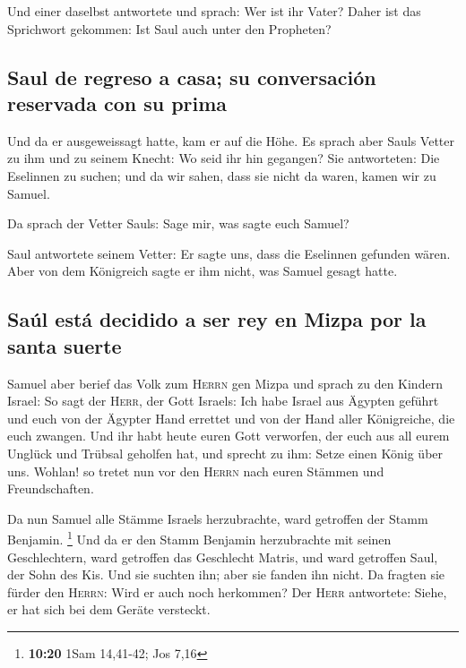  Und einer daselbst antwortete und sprach: Wer ist ihr
Vater? Daher ist das Sprichwort gekommen: Ist Saul auch unter den
Propheten?

\hypertarget{saul-de-regreso-a-casa-su-conversaciuxf3n-reservada-con-su-prima}{%
\subsection{Saul de regreso a casa; su conversación reservada con su
prima}\label{saul-de-regreso-a-casa-su-conversaciuxf3n-reservada-con-su-prima}}

 Und da er ausgeweissagt hatte, kam er auf die Höhe.
 Es sprach aber Sauls Vetter zu ihm und zu seinem Knecht:
Wo seid ihr hin gegangen? Sie antworteten: Die Eselinnen zu suchen; und
da wir sahen, dass sie nicht da waren, kamen wir zu Samuel.

 Da sprach der Vetter Sauls: Sage mir, was sagte euch
Samuel?

 Saul antwortete seinem Vetter: Er sagte uns, dass die
Eselinnen gefunden wären. Aber von dem Königreich sagte er ihm nicht,
was Samuel gesagt hatte.

\hypertarget{sauxfal-estuxe1-decidido-a-ser-rey-en-mizpa-por-la-santa-suerte}{%
\subsection{Saúl está decidido a ser rey en Mizpa por la santa
suerte}\label{sauxfal-estuxe1-decidido-a-ser-rey-en-mizpa-por-la-santa-suerte}}

 Samuel aber berief das Volk zum \textsc{Herrn} gen Mizpa
 und sprach zu den Kindern Israel: So sagt der
\textsc{Herr}, der Gott Israels: Ich habe Israel aus Ägypten geführt und
euch von der Ägypter Hand errettet und von der Hand aller Königreiche,
die euch zwangen.  Und ihr habt heute euren Gott
verworfen, der euch aus all eurem Unglück und Trübsal geholfen hat, und
sprecht zu ihm: Setze einen König über uns. Wohlan! so tretet nun vor
den \textsc{Herrn} nach euren Stämmen und Freundschaften.

 Da nun Samuel alle Stämme Israels herzubrachte, ward
getroffen der Stamm Benjamin. \footnote{\textbf{10:20} 1Sam 14,41-42;
  Jos 7,16}  Und da er den Stamm Benjamin herzubrachte
mit seinen Geschlechtern, ward getroffen das Geschlecht Matris, und ward
getroffen Saul, der Sohn des Kis. Und sie suchten ihn; aber sie fanden
ihn nicht.  Da fragten sie fürder den \textsc{Herrn}:
Wird er auch noch herkommen? Der \textsc{Herr} antwortete: Siehe, er hat
sich bei dem Geräte versteckt.

